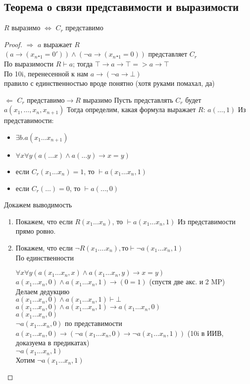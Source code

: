 \subsection{Теорема о связи представимости и выразимости}
\label{sec-11-2}
\begin{theorem}
$R$ выразимо $\Leftrightarrow$ $C_r$ представимо
\end{theorem}
\begin{proof}
$\Rightarrow$ $a$ выражает $R$\\
$(a \to (x_n₊_1=0')) \land (\lnot a \to (x_n₊_1=0))$
представляет $C_r$\\
По выразимости $R \vdash a$; тогда $\top\to a\to \top => a\to \top$\\
По 10i, перенесенной к нам $a \to (\lnot a \to \bot)$\\
правило с единственностью вроде понятно (хотя руками помахал, да)

$\Leftarrow$ $C_r \text{ представимо} \to R \text{ выразимо}$
Пусть представлять $C_r$ будет
$a(x_1, \dotsc, x_n,x_{n+1})$
Тогда определим, какая формула выражает $R$:
$a(\dotsc, 1)$
Из представимости:
\begin{itemize}
\item $\exists b.a(x_1\dots x_{n+1})$
\item $\forall x\forall y(a(\dots x) \land a(\dots  y) \to x = y)$
\item если $C_r(x_1\dots x_n) = 1$, то $\vdash a(x_1\dots x_n,1)$
\item если $C_r(\dots) = 0$, то $\vdash a(\dotsc, 0)$
\end{itemize}
Докажем выводимость
\begin{enumerate}
\item Покажем, что если $R(x_1\dots x_n)$, то $\vdash a(x_1\dots x_n, 1)$
Из представимости прямо ровно.
\item Покажем, что если $\lnot R(x_1\dots .x_n), то \vdash \lnot a(x_1\dots x_n, 1)$\\
По единственности

$\forall x\forall y(a(x_1\dots x_n, x) \land a(x_1\dots x_n, y) \to x = y)$\\
$a(x_1\dots x_n, 0) \land a(x_1\dots x_n, 1) \to (0 = 1)$ (спустя две акс. и 2 MP)\\
Делаем дедукцию\\
$a(x_1\dots x_n, 0) \land a(x_1\dots x_n, 1) \vdash \bot$\\
$a(x_1\dots x_n, 0) \land a(x_1\dots x_n, 1) \to a(x_1\dots x_n, 0)$\\
$a(x_1\dots x_n, 0)$\\
$\lnot a(x_1\dots x_n, 0)$ по представимости
$a(x_1\dots x_n, 0) \to (\lnot a(x_1\dots x_n, 0) \to \lnot a(x_1\dots x_n, 1))$ (10i в ИИВ, доказуема в предикатах)\\
$\lnot a(x_1\dots x_n, 1)$\\
Хотим $\lnot a(x_1\dots x_n, 1)$
\end{enumerate}
\end{proof}
